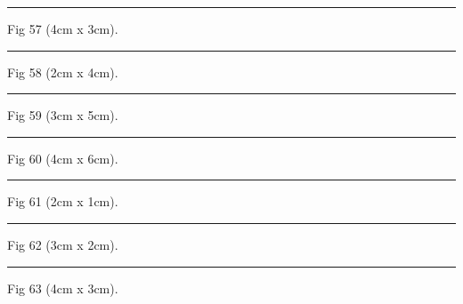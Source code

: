 \documentclass[a4paper,11pt]{article}
\begin{document}
\begin{swarmwrap}%
  \begin{minipage}[t]{4cm}
    \centering
    \rule{\linewidth}{3cm}
    {\footnotesize Fig 57 (4cm x 3cm).}
  \end{minipage}%
\end{swarmwrap}%
\swarmwrapnext
\lipsum[57]%

\begin{swarmwrap}%
  \begin{minipage}[t]{2cm}
    \centering
    \rule{\linewidth}{4cm}
    {\footnotesize Fig 58 (2cm x 4cm).}
  \end{minipage}%
\end{swarmwrap}%
\swarmwrapnext
\lipsum[58]%

\begin{swarmwrap}%
  \begin{minipage}[t]{3cm}
    \centering
    \rule{\linewidth}{5cm}
    {\footnotesize Fig 59 (3cm x 5cm).}
  \end{minipage}%
\end{swarmwrap}%
\swarmwrapnext
\lipsum[59]%

\begin{swarmwrap}%
  \begin{minipage}[t]{4cm}
    \centering
    \rule{\linewidth}{6cm}
    {\footnotesize Fig 60 (4cm x 6cm).}
  \end{minipage}%
\end{swarmwrap}%
\swarmwrapnext
\lipsum[60]%

\begin{swarmwrap}%
  \begin{minipage}[t]{2cm}
    \centering
    \rule{\linewidth}{1cm}
    {\footnotesize Fig 61 (2cm x 1cm).}
  \end{minipage}%
\end{swarmwrap}%
\swarmwrapnext
\lipsum[61]%

\begin{swarmwrap}%
  \begin{minipage}[t]{3cm}
    \centering
    \rule{\linewidth}{2cm}
    {\footnotesize Fig 62 (3cm x 2cm).}
  \end{minipage}%
\end{swarmwrap}%
\swarmwrapnext
\lipsum[62]%

\begin{swarmwrap}%
  \begin{minipage}[t]{4cm}
    \centering
    \rule{\linewidth}{3cm}
    {\footnotesize Fig 63 (4cm x 3cm).}
  \end{minipage}%
\end{swarmwrap}%
\swarmwrapnext
\lipsum[63]%
\end{document}
